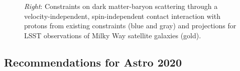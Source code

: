 \documentclass[12pt]{article}
\begin{document}
\begin{figure}[t]
{    %
    \emph{Right}: Constraints on dark matter-baryon scattering through a velocity-independent, spin-independent contact interaction with protons from existing constraints (blue and gray) and projections for LSST observations of Milky Way satellite galaxies (gold).
}
\end{figure}

\clearpage

\subsection*{Recommendations for Astro 2020}
\end{document}
